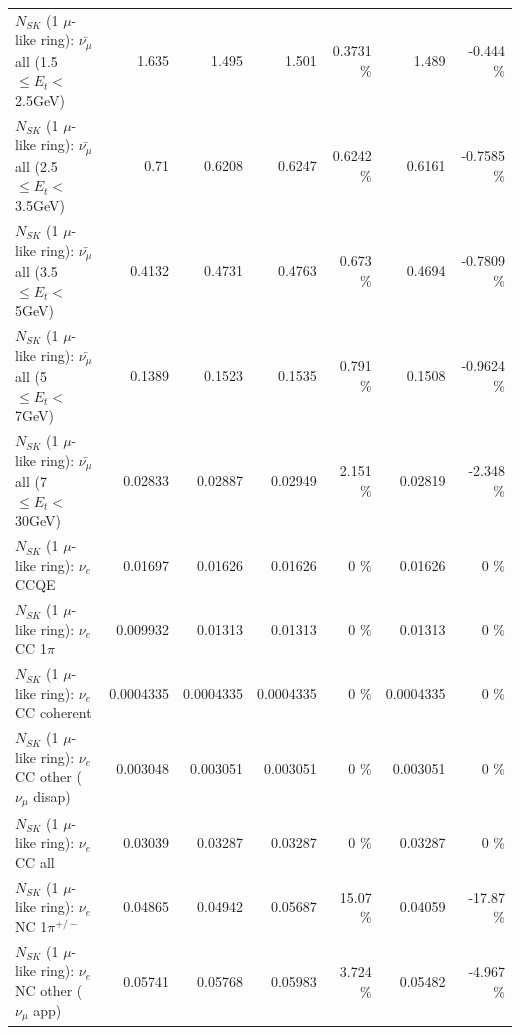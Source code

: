\begin{table}
\begin{tabular}{| l | r | r | r  r | r  r |}
 $N_{SK}$ (1 $\mu$-like ring): $\bar{\nu_{\mu}}$ all (1.5 $\leq E_{t} <$ 2.5GeV) &           1.635 &           1.495 &           1.501 &   0.3731 \%  &           1.489 &   -0.444 \%  \\ 
 $N_{SK}$ (1 $\mu$-like ring): $\bar{\nu_{\mu}}$ all (2.5 $\leq E_{t} <$ 3.5GeV) &            0.71 &          0.6208 &          0.6247 &   0.6242 \%  &          0.6161 &  -0.7585 \%  \\ 
   $N_{SK}$ (1 $\mu$-like ring): $\bar{\nu_{\mu}}$ all (3.5 $\leq E_{t} <$ 5GeV) &          0.4132 &          0.4731 &          0.4763 &    0.673 \%  &          0.4694 &  -0.7809 \%  \\ 
     $N_{SK}$ (1 $\mu$-like ring): $\bar{\nu_{\mu}}$ all (5 $\leq E_{t} <$ 7GeV) &          0.1389 &          0.1523 &          0.1535 &    0.791 \%  &          0.1508 &  -0.9624 \%  \\ 
    $N_{SK}$ (1 $\mu$-like ring): $\bar{\nu_{\mu}}$ all (7 $\leq E_{t} <$ 30GeV) &         0.02833 &         0.02887 &         0.02949 &    2.151 \%  &         0.02819 &   -2.348 \%  \\ 
\hline
\hline
\hline
                                      $N_{SK}$ (1 $\mu$-like ring): $\nu_e$ CCQE &         0.01697 &         0.01626 &         0.01626 &        0 \%  &         0.01626 &        0 \%  \\ 
                                 $N_{SK}$ (1 $\mu$-like ring): $\nu_e$ CC 1$\pi$ &        0.009932 &         0.01313 &         0.01313 &        0 \%  &         0.01313 &        0 \%  \\ 
                               $N_{SK}$ (1 $\mu$-like ring): $\nu_e$ CC coherent &       0.0004335 &       0.0004335 &       0.0004335 &        0 \%  &       0.0004335 &        0 \%  \\ 
                $N_{SK}$ (1 $\mu$-like ring): $\nu_e$ CC other ($\nu_\mu$ disap) &        0.003048 &        0.003051 &        0.003051 &        0 \%  &        0.003051 &        0 \%  \\ 
                                  $N_{SK}$ (1 $\mu$-like ring): $\nu_{e}$ CC all &         0.03039 &         0.03287 &         0.03287 &        0 \%  &         0.03287 &        0 \%  \\ 
\hline
                           $N_{SK}$ (1 $\mu$-like ring): $\nu_e$ NC 1$\pi^{+/-}$ &         0.04865 &         0.04942 &         0.05687 &    15.07 \%  &         0.04059 &   -17.87 \%  \\ 
                  $N_{SK}$ (1 $\mu$-like ring): $\nu_e$ NC other ($\nu_\mu$ app) &         0.05741 &         0.05768 &         0.05983 &    3.724 \%  &         0.05482 &   -4.967 \%  \\ 

\end{tabular}
\end{table}
